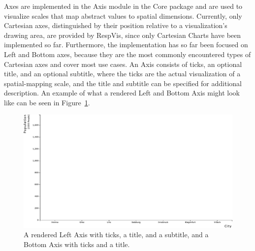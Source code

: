 Axes are implemented in the  Axis module in the Core
package and are used to visualize scales that map abstract values to
spatial dimensions. Currently, only Cartesian axes, distinguished by
their position relative to a visualization's drawing area, are provided
by RespVis, since only Cartesian Charts have been implemented so
far. Furthermore, the implementation has so far been focused on Left
and Bottom axes, because they are the most commonly encountered types
of Cartesian axes and cover most use cases. An Axis consists of ticks,
an optional title, and an optional subtitle, where the ticks are the
actual visualization of a spatial-mapping scale, and the title and
subtitle can be specified for additional description. An example of
what a rendered Left and Bottom Axis might look like can be seen in
Figure~\ref{fig:Axes}.

\begin{figure}[tp]
\centering
\includegraphics[keepaspectratio,width=\linewidth,height=\halfh]
{diagrams/axes.pdf}
\caption[Axes Example]{%
A rendered Left Axis with ticks, a title, and a subtitle, and a
Bottom Axis with ticks and a title.
}
\label{fig:Axes}
\end{figure}


